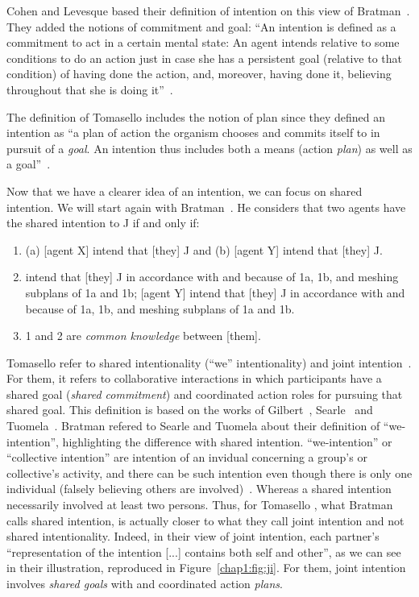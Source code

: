 \documentclass[a4paper,11pt,twoside]{StyleThese}
\begin{document}
Cohen and Levesque based their definition of intention on this view of Bratman~\cite{cohen_1990_intention}. They added the notions of commitment and goal: ``An intention is defined as a commitment to act in a certain mental state: An agent intends relative to some conditions to do an action just in case she has a persistent goal (relative to that condition) of having done the action, and, moreover, having done it, believing throughout that she is doing it''~\cite[p.~496]{cohen_1991_teamwork}. 

The definition of Tomasello \etal{} includes the notion of plan since they defined an intention as ``a plan of action the organism chooses and commits itself to in pursuit of a \textit{goal}. An intention thus includes both a means (action \textit{plan}) as well as a goal''~\cite[p.~676]{tomasello_2005_understanding}. 

Now that we have a clearer idea of an intention, we can focus on shared intention. We will start again with Bratman~\cite{bratman_1993_shared}. He considers that two agents have the shared intention to J if and only if: 
\begin{enumerate}
	\item (a) [agent X] intend that [they] J and (b) [agent Y] intend that [they] J.
	\item\relax [agent X] intend that [they] J in accordance with and because of 1a, 1b, and meshing subplans of 1a and 1b; [agent Y] intend that [they] J in accordance with and because of 1a, 1b, and meshing subplans of 1a and 1b.
	\item 1 and 2 are \textit{common knowledge} between [them].
\end{enumerate}

Tomasello \etal{} refer to shared intentionality (``we'' intentionality) and joint intention~\cite{tomasello_2005_understanding}. For them, it refers to collaborative interactions in which participants have a shared goal (\textit{shared commitment}) and coordinated action roles for pursuing that shared goal. This definition is based on the works of Gilbert~\cite{gilbert_1989_social}, Searle~\cite{searle_1983_intentionality} and Tuomela~\cite{tuomela_1995_importance}. Bratman refered to Searle and Tuomela about their definition of ``we-intention'', highlighting the difference with shared intention. ``we-intention'' or ``collective intention'' are intention of an invidual concerning a group's or collective's activity, and there can be such intention even though there is only one individual (falsely believing others are involved)~\cite{bratman_1993_shared}. Whereas a shared intention necessarily involved at least two persons. Thus, for Tomasello \etal, what Bratman calls shared intention, is actually closer to what they call joint intention and not shared intentionality. Indeed, in their view of joint intention, each partner's ``representation of the intention [...] contains both self and other'', as we can see in their illustration, reproduced in Figure~\ref{chap1:fig:ji}. For them, joint intention involves \textit{shared goals} with and coordinated action \textit{plans}. 
\end{document}
